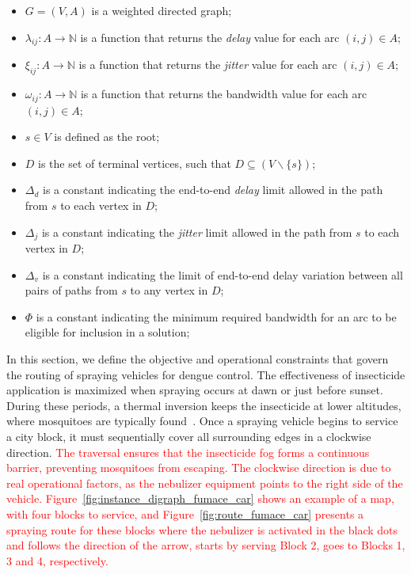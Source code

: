 {\begin{itemize}
    \item $G = (V, A)$ is a weighted directed graph;
    \item $\lambda_{ij} : A \rightarrow \mathbb{N}$ is a function that returns the \textit{delay} value for each arc $(i, j) \in A$;
    \item $\xi_{ij} : A \rightarrow \mathbb{N}$ is a function that returns the \textit{jitter} value for each arc $(i, j) \in A$;
    \item $\omega_{ij} : A \rightarrow \mathbb{N}$ is a function that returns the bandwidth value for each arc $(i, j) \in A$;
    \item $s \in V$ is defined as the root;
    \item $D$ is the set of terminal vertices, such that $D \subseteq (V \backslash \{s\})$;
    \item $\Delta_{d}$ is a constant indicating the end-to-end \textit{delay} limit allowed in the path from $s$ to each vertex in $D$;
    \item $\Delta_{j}$ is a constant indicating the \textit{jitter} limit allowed in the path from $s$ to each vertex in $D$;
    \item $\Delta_{v}$ is a constant indicating the limit of end-to-end delay variation between all pairs of paths from $s$ to any vertex in $D$;
    \item $\Phi$ is a constant indicating the minimum required bandwidth for an arc to be eligible for inclusion in a solution;
\end{itemize}

In this section, we define the objective and operational constraints that govern the routing of spraying vehicles for dengue control. The effectiveness of insecticide application is maximized when spraying occurs at dawn or just before sunset. During these periods, a thermal inversion keeps the insecticide at lower altitudes, where mosquitoes are typically found~\citep{MS}. Once a spraying vehicle begins to service a city block, it must sequentially cover all surrounding edges in a clockwise direction. \textcolor{red}{The traversal ensures that the insecticide fog forms a continuous barrier, preventing mosquitoes from escaping. The clockwise direction is due to real operational factors, as the nebulizer equipment points to the right side of the vehicle.
Figure~\ref{fig:instance_digraph_fumace_car} shows an example of a map,
with four blocks to service, and Figure~\ref{fig:route_fumace_car} presents a spraying route for these blocks where the nebulizer is activated in the black dots and follows the direction of the arrow, starts by serving Block 2, goes to Blocks 1, 3 and 4, respectively.
}

}
